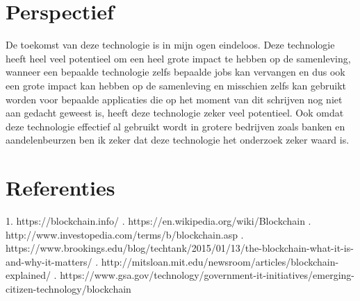 \documentclass[fleqn,10pt]{voorstel}
\begin{document}
\section{Perspectief}
De toekomst van deze technologie is in mijn ogen eindeloos. Deze technologie heeft heel veel potentieel om een heel grote impact te hebben op de samenleving, wanneer een bepaalde technologie zelfs bepaalde jobs kan vervangen en dus ook een grote impact kan hebben op de samenleving en misschien zelfs kan gebruikt worden voor bepaalde applicaties die op het moment van dit schrijven nog niet aan gedacht geweest is, heeft deze technologie zeker veel potentieel. Ook omdat deze technologie effectief al gebruikt wordt in grotere bedrijven zoals banken en aandelenbeurzen ben ik zeker dat deze technologie het onderzoek zeker waard is.



\section{Referenties}
1. https://blockchain.info/ . https://en.wikipedia.org/wiki/Blockchain . http://www.investopedia.com/terms/b/blockchain.asp . https://www.brookings.edu/blog/techtank/2015/01/13/the-blockchain-what-it-is-and-why-it-matters/ . http://mitsloan.mit.edu/newsroom/articles/blockchain-explained/ . https://www.gsa.gov/technology/government-it-initiatives/emerging-citizen-technology/blockchain \newline
\printbibliography
\end{document}
